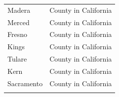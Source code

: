 \documentclass[12pt,]{article}
\begin{document}
\begin{longtable}[]{@{}ll@{}}
\begin{minipage}[t]{0.59\columnwidth}\raggedright\strut
Madera\strut
\end{minipage} & \begin{minipage}[t]{0.18\columnwidth}\raggedright\strut
County in California\strut
\end{minipage}\tabularnewline
\begin{minipage}[t]{0.59\columnwidth}\raggedright\strut
Merced\strut
\end{minipage} & \begin{minipage}[t]{0.18\columnwidth}\raggedright\strut
County in California\strut
\end{minipage}\tabularnewline
\begin{minipage}[t]{0.59\columnwidth}\raggedright\strut
Fresno\strut
\end{minipage} & \begin{minipage}[t]{0.18\columnwidth}\raggedright\strut
County in California\strut
\end{minipage}\tabularnewline
\begin{minipage}[t]{0.59\columnwidth}\raggedright\strut
Kings\strut
\end{minipage} & \begin{minipage}[t]{0.18\columnwidth}\raggedright\strut
County in California\strut
\end{minipage}\tabularnewline
\begin{minipage}[t]{0.59\columnwidth}\raggedright\strut
Tulare\strut
\end{minipage} & \begin{minipage}[t]{0.18\columnwidth}\raggedright\strut
County in California\strut
\end{minipage}\tabularnewline
\begin{minipage}[t]{0.59\columnwidth}\raggedright\strut
Kern\strut
\end{minipage} & \begin{minipage}[t]{0.18\columnwidth}\raggedright\strut
County in California\strut
\end{minipage}\tabularnewline
\begin{minipage}[t]{0.59\columnwidth}\raggedright\strut
Sacramento\strut
\end{minipage} & \begin{minipage}[t]{0.18\columnwidth}\raggedright\strut
County in California\strut
\end{minipage}\tabularnewline
\begin{minipage}[t]{0.59\columnwidth}\raggedright\strut

\end{minipage}
\end{longtable}
\end{document}
